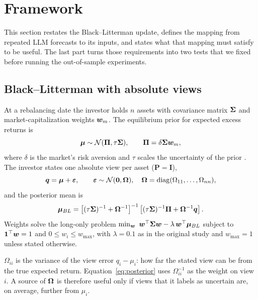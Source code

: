 \section{Framework}\label{sec:framework}

This section restates the Black--Litterman update, defines the mapping from repeated LLM forecasts to its inputs, and states what that mapping must satisfy to be useful. The last part turns those requirements into two tests that we fixed before running the out-of-sample experiments.

\subsection{Black--Litterman with absolute views}
At a rebalancing date the investor holds $n$ assets with covariance matrix $\bm{\Sigma}$ and market-capitalization weights $\bm{w}_m$. The equilibrium prior for expected excess returns is
\begin{equation}
  \bm{\mu} \sim \mathcal{N}(\bm{\Pi}, \tau\bm{\Sigma}), \qquad \bm{\Pi} = \delta \bm{\Sigma} \bm{w}_m ,
\end{equation}
where $\delta$ is the market's risk aversion and $\tau$ scales the uncertainty of the prior \citep{black1992global,he2002intuition}. The investor states one absolute view per asset ($\bm{P}=\bm{I}$),
\begin{equation}
  \bm{q} = \bm{\mu} + \bm{\varepsilon}, \qquad \bm{\varepsilon} \sim \mathcal{N}(\bm{0}, \bm{\Omega}), \quad \bm{\Omega} = \mathrm{diag}(\Omega_{11},\dots,\Omega_{nn}),
\end{equation}
and the posterior mean is
\begin{equation}\label{eq:posterior}
  \bm{\mu}_{BL} = \left[(\tau\bm{\Sigma})^{-1} + \bm{\Omega}^{-1}\right]^{-1}\left[(\tau\bm{\Sigma})^{-1}\bm{\Pi} + \bm{\Omega}^{-1}\bm{q}\right].
\end{equation}
Weights solve the long-only problem $\min_{\bm{w}}\ \bm{w}^\top\bm{\Sigma}\bm{w} - \lambda\,\bm{w}^\top\bm{\mu}_{BL}$ subject to $\bm{1}^\top\bm{w} = 1$ and $0 \le w_i \le w_{\max}$, with $\lambda = 0.1$ as in the original study and $w_{\max}=1$ unless stated otherwise.

$\Omega_{ii}$ is the variance of the view error $q_i - \mu_i$: how far the stated view can be from the true expected return. Equation~\eqref{eq:posterior} uses $\Omega_{ii}^{-1}$ as the weight on view $i$. A source of $\bm{\Omega}$ is therefore useful only if views that it labels as uncertain are, on average, further from $\mu_i$.

